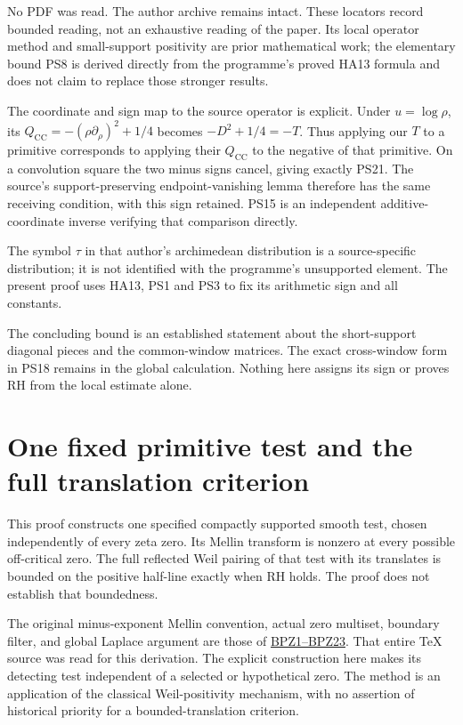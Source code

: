 \documentclass[
  10pt,
  a4paper,
]{article}
\begin{document}
No PDF was read. The author archive remains intact. These locators
record bounded reading, not an exhaustive reading of the paper. Its
local operator method and small-support positivity are prior
mathematical work; the elementary bound PS8 is derived directly from the
programme's proved HA13 formula and does not claim to replace those
stronger results.

The coordinate and sign map to the source operator is explicit. Under
\(u=\log\rho\), its \(Q_{\mathrm{CC}}=-(\rho\partial_\rho)^2+1/4\)
becomes \(-D^2+1/4=-T\). Thus applying our \(T\) to a primitive
corresponds to applying their \(Q_{\mathrm{CC}}\) to the negative of
that primitive. On a convolution square the two minus signs cancel,
giving exactly PS21. The source's support-preserving endpoint-vanishing
lemma therefore has the same receiving condition, with this sign
retained. PS15 is an independent additive-coordinate inverse verifying
that comparison directly.

The symbol \(\tau\) in that author's archimedean distribution is a
source-specific distribution; it is not identified with the programme's
unsupported element. The present proof uses HA13, PS1 and PS3 to fix its
arithmetic sign and all constants.

The concluding bound is an established statement about the short-support
diagonal pieces and the common-window matrices. The exact cross-window
form in PS18 remains in the global calculation. Nothing here assigns its
sign or proves RH from the local estimate alone.

\clearpage

\section{One fixed primitive test and the full translation
criterion}\label{one-fixed-primitive-test-and-the-full-translation-criterion}

This proof constructs one specified compactly supported smooth test,
chosen independently of every zeta zero. Its Mellin transform is nonzero
at every possible off-critical zero. The full reflected Weil pairing of
that test with its translates is bounded on the positive half-line
exactly when RH holds. The proof does not establish that boundedness.

The original minus-exponent Mellin convention, actual zero multiset,
boundary filter, and global Laplace argument are those of
\href{BOUNDARY_PRIMITIVE_ALL_ZERO_RECEIVER.tex}{BPZ1--BPZ23}. That
entire TeX source was read for this derivation. The explicit
construction here makes its detecting test independent of a selected or
hypothetical zero. The method is an application of the classical
Weil-positivity mechanism, with no assertion of historical priority for
a bounded-translation criterion.
\end{document}
